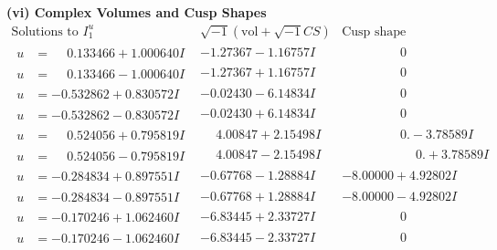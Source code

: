 \documentclass[1p]{elsarticle_modified}
\theoremstyle{definition}
\newcommand{\I}{\sqrt{-1}}
\begin{document}
\newpage\flushleft \textbf{(vi) Complex Volumes and Cusp Shapes}
$$\begin{array}{c|c|c}  
\text{Solutions to }I^u_{1}& \I (\text{vol} + \sqrt{-1}CS) & \text{Cusp shape}\\
 \hline 
\begin{aligned}
u &= \phantom{-}0.133466 + 1.000640 I\end{aligned}
 & -1.27367 - 1.16757 I & \phantom{-0.000000 } 0 \\ \hline\begin{aligned}
u &= \phantom{-}0.133466 - 1.000640 I\end{aligned}
 & -1.27367 + 1.16757 I & \phantom{-0.000000 } 0 \\ \hline\begin{aligned}
u &= -0.532862 + 0.830572 I\end{aligned}
 & -0.02430 - 6.14834 I & \phantom{-0.000000 } 0 \\ \hline\begin{aligned}
u &= -0.532862 - 0.830572 I\end{aligned}
 & -0.02430 + 6.14834 I & \phantom{-0.000000 } 0 \\ \hline\begin{aligned}
u &= \phantom{-}0.524056 + 0.795819 I\end{aligned}
 & \phantom{-}4.00847 + 2.15498 I & \phantom{-0.000000 } 0. - 3.78589 I \\ \hline\begin{aligned}
u &= \phantom{-}0.524056 - 0.795819 I\end{aligned}
 & \phantom{-}4.00847 - 2.15498 I & \phantom{-0.000000 -}0. + 3.78589 I \\ \hline\begin{aligned}
u &= -0.284834 + 0.897551 I\end{aligned}
 & -0.67768 - 1.28884 I & -8.00000 + 4.92802 I \\ \hline\begin{aligned}
u &= -0.284834 - 0.897551 I\end{aligned}
 & -0.67768 + 1.28884 I & -8.00000 - 4.92802 I \\ \hline\begin{aligned}
u &= -0.170246 + 1.062460 I\end{aligned}
 & -6.83445 + 2.33727 I & \phantom{-0.000000 } 0 \\ \hline\begin{aligned}
u &= -0.170246 - 1.062460 I\end{aligned}
 & -6.83445 - 2.33727 I & \phantom{-0.000000 } 0 \\ \hline\begin{aligned}

\end{aligned}
\end{array}$$
\end{document}

